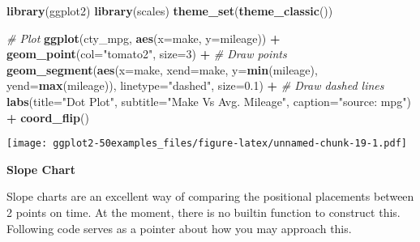 \documentclass[a4paper]{article}
\newenvironment{Shaded}{\begin{snugshade}}{\end{snugshade}}
\newcommand{\KeywordTok}[1]{\textcolor[rgb]{0.13,0.29,0.53}{\textbf{#1}}}
\newcommand{\DataTypeTok}[1]{\textcolor[rgb]{0.13,0.29,0.53}{#1}}
\newcommand{\DecValTok}[1]{\textcolor[rgb]{0.00,0.00,0.81}{#1}}
\newcommand{\FloatTok}[1]{\textcolor[rgb]{0.00,0.00,0.81}{#1}}
\newcommand{\StringTok}[1]{\textcolor[rgb]{0.31,0.60,0.02}{#1}}
\newcommand{\CommentTok}[1]{\textcolor[rgb]{0.56,0.35,0.01}{\textit{#1}}}
\newcommand{\OperatorTok}[1]{\textcolor[rgb]{0.81,0.36,0.00}{\textbf{#1}}}
\newcommand{\NormalTok}[1]{#1}
\begin{document}
\begin{Shaded}
\begin{Highlighting}[]
\KeywordTok{library}\NormalTok{(ggplot2)}
\KeywordTok{library}\NormalTok{(scales)}
\KeywordTok{theme_set}\NormalTok{(}\KeywordTok{theme_classic}\NormalTok{())}

\CommentTok{# Plot}
\KeywordTok{ggplot}\NormalTok{(cty_mpg, }\KeywordTok{aes}\NormalTok{(}\DataTypeTok{x=}\NormalTok{make, }\DataTypeTok{y=}\NormalTok{mileage)) }\OperatorTok{+}\StringTok{ }
\StringTok{  }\KeywordTok{geom_point}\NormalTok{(}\DataTypeTok{col=}\StringTok{"tomato2"}\NormalTok{, }\DataTypeTok{size=}\DecValTok{3}\NormalTok{) }\OperatorTok{+}\StringTok{   }\CommentTok{# Draw points}
\StringTok{  }\KeywordTok{geom_segment}\NormalTok{(}\KeywordTok{aes}\NormalTok{(}\DataTypeTok{x=}\NormalTok{make, }
                   \DataTypeTok{xend=}\NormalTok{make, }
                   \DataTypeTok{y=}\KeywordTok{min}\NormalTok{(mileage), }
                   \DataTypeTok{yend=}\KeywordTok{max}\NormalTok{(mileage)), }
               \DataTypeTok{linetype=}\StringTok{"dashed"}\NormalTok{, }
               \DataTypeTok{size=}\FloatTok{0.1}\NormalTok{) }\OperatorTok{+}\StringTok{   }\CommentTok{# Draw dashed lines}
\StringTok{  }\KeywordTok{labs}\NormalTok{(}\DataTypeTok{title=}\StringTok{"Dot Plot"}\NormalTok{, }
       \DataTypeTok{subtitle=}\StringTok{"Make Vs Avg. Mileage"}\NormalTok{, }
       \DataTypeTok{caption=}\StringTok{"source: mpg"}\NormalTok{) }\OperatorTok{+}\StringTok{  }
\StringTok{  }\KeywordTok{coord_flip}\NormalTok{()}
\end{Highlighting}
\end{Shaded}

\texttt{[image: ggplot2-50examples\_files/figure-latex/unnamed-chunk-19-1.pdf]}
\newpage

\textbf{Slope Chart}

Slope charts are an excellent way of comparing the positional placements
between 2 points on time. At the moment, there is no builtin function to
construct this. Following code serves as a pointer about how you may
approach this.
\end{document}
